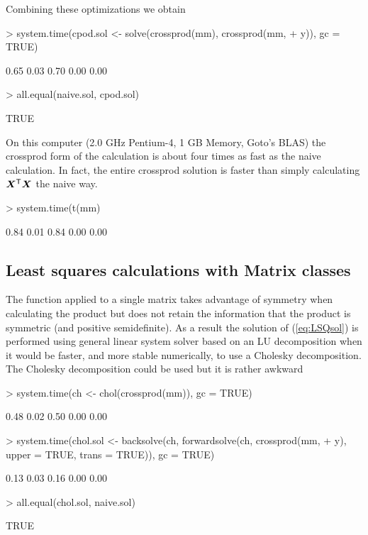 \documentclass{article}
\begin{document}
Combining these optimizations we obtain
\begin{Schunk}
\begin{Sinput}
> system.time(cpod.sol <- solve(crossprod(mm), crossprod(mm, 
+     y)), gc = TRUE)
\end{Sinput}
\begin{Soutput}
[1] 0.65 0.03 0.70 0.00 0.00
\end{Soutput}
\begin{Sinput}
> all.equal(naive.sol, cpod.sol)
\end{Sinput}
\begin{Soutput}
[1] TRUE
\end{Soutput}
\end{Schunk}

On this computer (2.0 GHz Pentium-4, 1 GB Memory, Goto's BLAS) the
crossprod form of the calculation is about four times as fast as the
naive calculation.  In fact, the entire crossprod solution is
faster than simply calculating $\bm{X}^\mathsf{T}\bm{X}$ the naive way.
\begin{Schunk}
\begin{Sinput}
> system.time(t(mm) %*% mm, gc = TRUE)
\end{Sinput}
\begin{Soutput}
[1] 0.84 0.01 0.84 0.00 0.00
\end{Soutput}
\end{Schunk}

\subsection{Least squares calculations with Matrix classes}
\label{sec:MatrixLSQ}

The  function applied to a single matrix takes
advantage of symmetry when calculating the product but does not retain
the information that the product is symmetric (and positive
semidefinite).  As a result the solution of (\ref{eq:LSQsol}) is
performed using general linear system solver based on an LU
decomposition when it would be faster, and more stable numerically, to
use a Cholesky decomposition.  The Cholesky decomposition could be used
but it is rather awkward
\begin{Schunk}
\begin{Sinput}
> system.time(ch <- chol(crossprod(mm)), gc = TRUE)
\end{Sinput}
\begin{Soutput}
[1] 0.48 0.02 0.50 0.00 0.00
\end{Soutput}
\begin{Sinput}
> system.time(chol.sol <- backsolve(ch, forwardsolve(ch, crossprod(mm, 
+     y), upper = TRUE, trans = TRUE)), gc = TRUE)
\end{Sinput}
\begin{Soutput}
[1] 0.13 0.03 0.16 0.00 0.00
\end{Soutput}
\begin{Sinput}
> all.equal(chol.sol, naive.sol)
\end{Sinput}
\begin{Soutput}
[1] TRUE
\end{Soutput}
\end{Schunk}
\end{document}

